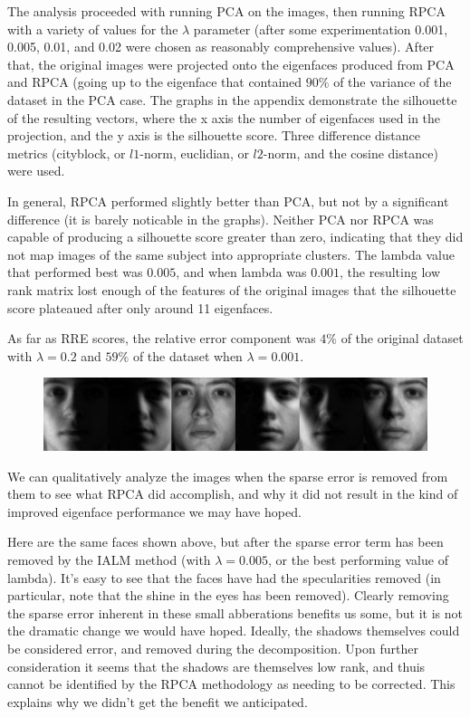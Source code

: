 \documentclass[11pt]{scrartcl} %
\theoremstyle{plain}
\begin{document}
The analysis proceeded with running PCA on the images, then running RPCA with a variety of values for the $\lambda$ parameter (after some experimentation 0.001, 0.005, 0.01, and 0.02 were chosen as reasonably comprehensive values). After that, the original images were projected onto the eigenfaces produced from PCA and RPCA (going up to the eigenface that contained $90\%$ of the variance of the dataset in the PCA case. The graphs in the appendix demonstrate the silhouette of the resulting vectors, where the x axis the number of eigenfaces used in the projection, and the y axis is the silhouette score. Three difference distance metrics (cityblock, or $l1$-norm, euclidian, or $l2$-norm, and the cosine distance) were used. 

In general, RPCA performed slightly better than PCA, but not by a significant difference (it is barely noticable in the graphs). Neither PCA nor RPCA was capable of producing a silhouette score greater than zero, indicating that they did not map images of the same subject into appropriate clusters. The lambda value that performed best was $0.005$, and when lambda was $0.001$, the resulting low rank matrix lost enough of the features of the original images that the silhouette score plateaued after only around 11 eigenfaces.

As far as RRE scores, the relative error component was $4\%$ of the original dataset with $\lambda = 0.2$ and $59\%$ of the dataset when $\lambda = 0.001$.

\begin{figure}[H]
\includegraphics[width=\textwidth]{figures/person24Afterl=0dot005RPCAtrial1.jpg} 
\centering
\end{figure}

We can qualitatively analyze the images when the sparse error is removed from them to see what RPCA did accomplish, and why it did not result in the kind of improved eigenface performance we may have hoped. 

Here are the same faces shown above, but after the sparse error term has been removed by the IALM method (with $\lambda = 0.005$, or the best performing value of lambda). It's easy to see that the faces have had the specularities removed (in particular, note that the shine in the eyes has been removed). Clearly removing the sparse error inherent in these small abberations benefits us some, but it is not the dramatic change we would have hoped. Ideally, the shadows themselves could be considered error, and removed during the decomposition. Upon further consideration it seems that the shadows are themselves low rank, and thuis cannot be identified by the RPCA methodology as needing to be corrected. This explains why we didn't get the benefit we anticipated.
\end{document}
